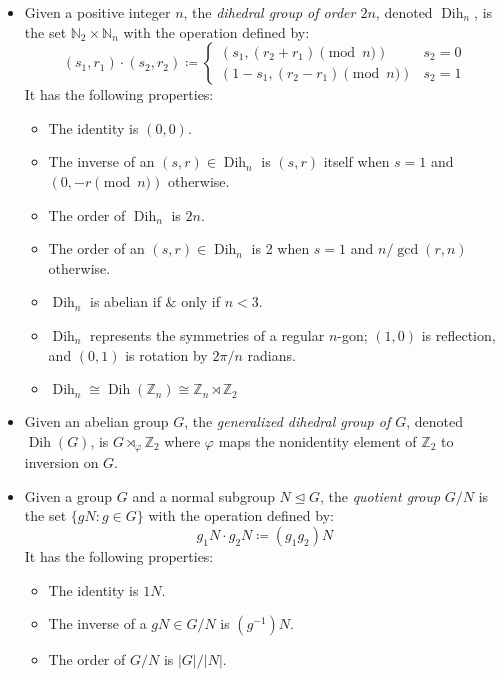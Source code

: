 \documentclass{article}
\newcommand{\N}{\mathbb{N}}
\newcommand{\Z}{\mathbb{Z}}
\DeclareMathOperator{\Dih}{Dih}
\newcommand{\normaleq}{\trianglelefteq}
\begin{document}
\begin{itemize}
\item Given a positive integer $n$, the \emph{dihedral group of order $2n$}, denoted $\Dih_n$, is the set $\N_2\times\N_n$ with the operation defined by: $$(s_1, r_1)\cdot(s_2, r_2)\coloneqq \begin{cases}(s_1, (r_2 + r_1)\pmod{n}) & s_2 = 0 \\ (1-s_1, (r_2 - r_1)\pmod{n}) & s_2 = 1\end{cases}$$  It has the following properties:
 \begin{itemize}
 \item The identity is $(0,0)$.
 \item The inverse of an $(s,r)\in\Dih_n$ is $(s,r)$ itself when $s=1$ and $(0, -r\pmod{n})$ otherwise.
 \item The order of $\Dih_n$ is $2n$.
 \item The order of an $(s,r)\in\Dih_n$ is 2 when $s=1$ and $n/\gcd(r,n)$ otherwise.
 \item $\Dih_n$ is abelian if \& only if $n<3$.
 \item $\Dih_n$ represents the symmetries of a regular $n$-gon; $(1,0)$ is reflection, and $(0,1)$ is rotation by $2\pi/n$ radians.
 \item $\Dih_n \cong \Dih(\Z_n) \cong \Z_n\rtimes\Z_2$
 \end{itemize}
\item Given an abelian group $G$, the \emph{generalized dihedral group of $G$}, denoted $\Dih(G)$, is $G\rtimes_\varphi\Z_2$ where $\varphi$ maps the nonidentity element of $\Z_2$ to inversion on $G$.

\item Given a group $G$ and a normal subgroup $N\normaleq G$, the \emph{quotient group} $G/N$ is the set $\{gN : g\in G\}$ with the operation defined by: $$g_1N \cdot g_2N \coloneqq (g_1g_2)N$$  It has the following properties:
 \begin{itemize}
 \item The identity is $1N$.
 \item The inverse of a $gN\in G/N$ is $(g^{-1})N$.
 \item The order of $G/N$ is $|G|/|N|$.
 \end{itemize}


\end{itemize}
\end{document}
